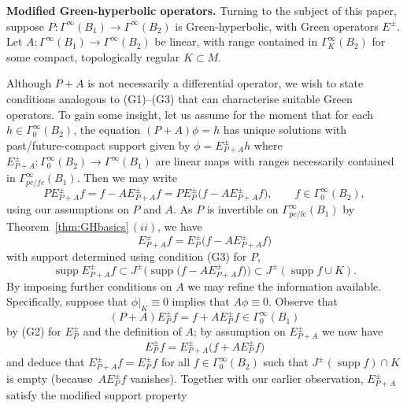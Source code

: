 \documentclass[11pt]{article}
\numberwithin{equation}{section}
\numberwithin{equation}{section}
\newcommand{\GoinX}[1]{\Gamma_0^\infty({#1})}
\newcommand{\fc}{\mathrm{fc}}
\newcommand{\pc}{\mathrm{pc}}
\DeclareMathOperator{\supp}{supp}
\begin{document}
\setcounter{Theorem}{3}
 {\bf Modified Green-hyperbolic operators.}
 Turning to the subject of this paper, suppose $P\colon \Gamma^\infty(B_1)\to \Gamma^\infty(B_2)$ is Green-hyperbolic, with Green operators $E^\pm$. Let $A\colon\Gamma^\infty(B_1)\to \Gamma^\infty(B_2)$ be linear, with range contained in $\Gamma^\infty_K(B_2)$ for some compact, topologically regular $K\subset M$.

 Although $P+A$ is not necessarily a differential operator, we wish to state conditions analogous to (G1)--(G3) that can characterise suitable Green operators.
 To gain some insight, let us assume for the moment that
 for each $h\in \GoinX{B_2}$, the equation $(P+A)\phi=h$ has unique solutions with past/future-compact support given by $\phi=E_{P+A}^\pm h$ where $E_{P+A}^{\pm}\colon \GoinX{B_2}\to \Gamma^\infty(B_1)$ are linear maps with ranges
 necessarily contained in $\Gamma^\infty_{pc/fc}(B_1)$. Then we may write
 \begin{equation*}
 	PE_{P+A}^\pm f = f- AE_{P+A}^\pm f = PE_P^\pm\big(f- AE_{P+A}^\pm f\big),\qquad f\in \GoinX{B_2},
 \end{equation*}
 using our assumptions on $P$ and $A$. As $P$ is invertible on $\Gamma^\infty_{\pc/\fc}(B_1)$ by Theorem~\ref{thm:GHbasics}\,$(ii)$, we have
 \begin{equation*}
 	E_{P+A}^\pm f = E_P^\pm \big(f-AE_{P+A}^\pm f\big)
 \end{equation*}
 with support determined using condition (G3) for $P$,
 \begin{equation*}
 	\supp E_{P+A}^\pm f \subset J^\pm \big(\supp \big(f-AE_{P+A}^\pm f\big)\big) \subset J^\pm(\supp f\cup K).
 \end{equation*}
 By imposing further conditions on $A$ we may refine the information available. Specifically, suppose that $\phi|_K\equiv 0$ implies that $A\phi\equiv 0$.
 Observe that
 \begin{equation*}
 	(P+A)E_P^\pm f = f+ AE_P^\pm f \in \GoinX{B_1}
 \end{equation*}
 by (G2) for $E_P^\pm$ and the definition of $A$; by assumption on $E^\pm_{P+A}$ we now have
 \begin{equation*}
 	E_P^\pm f = E_{P+A}^\pm \big(f+ AE_P^\pm f\big)
 \end{equation*}
 and deduce that $E_{P+A}^\pm f=E_P^\pm f$ for all $f\in \GoinX{B_2}$ such that
 $J^\pm(\supp f)\cap K$ is empty \big(because~$AE_P^\pm f$ vanishes\big). Together with our earlier observation, $E^\pm_{P+A}$ satisfy the modified support property
\end{document}

